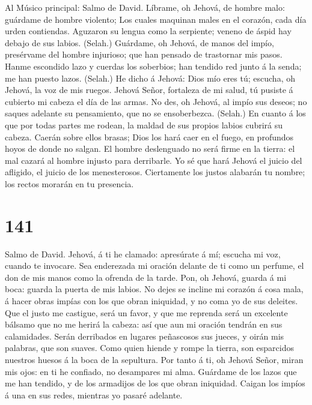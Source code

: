  Al Músico principal: Salmo de David. Líbrame, oh Jehová,
de hombre malo: guárdame de hombre violento;  Los cuales
maquinan males en el corazón, cada día urden contiendas. 
Aguzaron su lengua como la serpiente; veneno de áspid hay debajo de sus
labios. (Selah.)  Guárdame, oh Jehová, de manos del impío,
presérvame del hombre injurioso; que han pensado de trastornar mis
pasos.  Hanme escondido lazo y cuerdas los soberbios; han
tendido red junto á la senda; me han puesto lazos. (Selah.)
 He dicho á Jehová: Dios mío eres tú; escucha, oh Jehová,
la voz de mis ruegos.  Jehová Señor, fortaleza de mi
salud, tú pusiste á cubierto mi cabeza el día de las armas.
 No des, oh Jehová, al impío sus deseos; no saques
adelante su pensamiento, que no se ensoberbezca. (Selah.) 
En cuanto á los que por todas partes me rodean, la maldad de sus propios
labios cubrirá su cabeza.  Caerán sobre ellos brasas;
Dios los hará caer en el fuego, en profundos hoyos de donde no salgan.
 El hombre deslenguado no será firme en la tierra: el mal
cazará al hombre injusto para derribarle.  Yo sé que hará
Jehová el juicio del afligido, el juicio de los menesterosos.
 Ciertamente los justos alabarán tu nombre; los rectos
morarán en tu presencia.

\hypertarget{section-140}{%
\section{141}\label{section-140}}

 Salmo de David. Jehová, á ti he clamado: apresúrate á mí;
escucha mi voz, cuando te invocare.  Sea enderezada mi
oración delante de ti como un perfume, el don de mis manos como la
ofrenda de la tarde.  Pon, oh Jehová, guarda á mi boca:
guarda la puerta de mis labios.  No dejes se incline mi
corazón á cosa mala, á hacer obras impías con los que obran iniquidad, y
no coma yo de sus deleites.  Que el justo me castigue,
será un favor, y que me reprenda será un excelente bálsamo que no me
herirá la cabeza: así que aun mi oración tendrán en sus calamidades.
 Serán derribados en lugares peñascosos sus jueces, y
oirán mis palabras, que son suaves.  Como quien hiende y
rompe la tierra, son esparcidos nuestros huesos á la boca de la
sepultura.  Por tanto á ti, oh Jehová Señor, miran mis
ojos: en ti he confiado, no desampares mi alma.  Guárdame
de los lazos que me han tendido, y de los armadijos de los que obran
iniquidad.  Caigan los impíos á una en sus redes,
mientras yo pasaré adelante.

